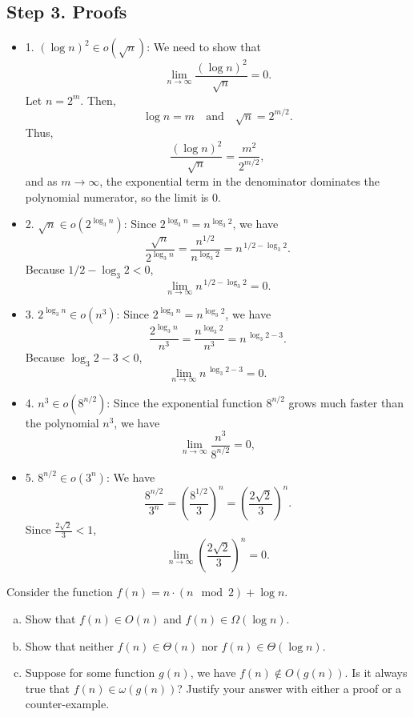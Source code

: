 \documentclass[11pt]{article}
\begin{document}
    \subsection*{Step 3. Proofs}
    \begin{itemize}
        \item {1. \((\log n)^2 \in o(\sqrt{n})\):}
        We need to show that
        \[
        \lim_{n\to\infty}\frac{(\log n)^2}{\sqrt{n}} = 0.
        \]
        Let \(n = 2^m\). Then,
        \[
        \log n = m \quad \text{and} \quad \sqrt{n} = 2^{m/2}.
        \]
        Thus,
        \[
        \frac{(\log n)^2}{\sqrt{n}} = \frac{m^2}{2^{m/2}},
        \]
        and as \(m\to\infty\), the exponential term in the denominator dominates the polynomial numerator, so the limit is 0.

        \item{2. \(\sqrt{n} \in o(2^{\log_3 n})\):}
        Since \(2^{\log_3 n} = n^{\log_3 2}\), we have
        \[
        \frac{\sqrt{n}}{2^{\log_3 n}} = \frac{n^{1/2}}{n^{\log_3 2}} = n^{\,1/2-\log_3 2}.
        \]
        Because \(1/2 - \log_3 2 < 0\),
        \[
        \lim_{n\to\infty} n^{\,1/2-\log_3 2} = 0.
        \]

        \item {3. \(2^{\log_3 n} \in o(n^3)\):}
        Since \(2^{\log_3 n} = n^{\log_3 2}\), we have
        \[
        \frac{2^{\log_3 n}}{n^3} = \frac{n^{\log_3 2}}{n^3} = n^{\,\log_3 2-3}.
        \]
        Because \(\log_3 2-3 < 0\),
        \[
        \lim_{n\to\infty} n^{\,\log_3 2-3} = 0.
        \]

        \item{4. \(n^3 \in o(8^{n/2})\):}
        Since the exponential function \(8^{n/2}\) grows much faster than the polynomial \(n^3\), we have
        \[
        \lim_{n\to\infty} \frac{n^3}{8^{n/2}} = 0,
        \]
        

        \item {5. \(8^{n/2} \in o(3^n)\):}
        We have
        \[
        \frac{8^{n/2}}{3^n} = \left(\frac{8^{1/2}}{3}\right)^n = \left(\frac{2\sqrt{2}}{3}\right)^n.
        \]
        Since \(\frac{2\sqrt{2}}{3} < 1\),
        \[
        \lim_{n\to\infty} \left(\frac{2\sqrt{2}}{3}\right)^n = 0.
        \]
    \end{itemize}

    \newpage
    \begin{tcolorbox}[title={Problem 2 (30 pts)}]
    Consider the function $f(n)= n\cdot ( n \mod 2) + \log n$.
    
    \begin{enumerate}[(a)]
        \item Show that $f(n) \in O(n)$ and $f(n) \in \Omega(\log n)$.
        \item Show that neither $f(n) \in \Theta(n)$ nor $f(n) \in \Theta(\log n)$.
        \item Suppose for some function $g(n)$, we have $f(n) \not \in O(g(n))$. Is it always true that $f(n)\in \omega(g(n))$? Justify your answer with either a proof or a counter-example.
    \end{enumerate}
    \end{tcolorbox}
\end{document}

